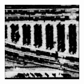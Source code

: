 \documentclass[usenames,dvipsnames,10pt]{beamer}
\begin{document}
\begin{frame}
\begin{minipage}[]{0.3\textwidth}
	\includegraphics[width=\textwidth]{graphics/tfcn-output-04.jpg}
\end{minipage}
\end{frame}
\end{document}
